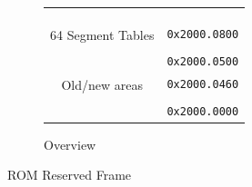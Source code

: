 \documentclass[12pt,a4paper,openright,twoside]{report}
\begin{document}
\begin{figure}[h]
\begin{subfigure}[b]{0.4\textwidth}
\begin{tabular}{cl}
			\multicolumn{1}{|c|}{\multirow{4}{*}{\cellcolor{gray}}}               &                                       \\ [3ex]
			\multicolumn{1}{|c|}{\cellcolor{gray}}                                &                                       \\
			\multicolumn{1}{|c|}{\cellcolor{gray}}                                &                                       \\
			\multicolumn{1}{|c|}{\cellcolor{gray}}                                & \multirow{2}{*}{\texttt{0x2000.0800}} \\ \cline{1-1}
			\multicolumn{1}{|c|}{\multirow{4}{*}{64 Segment Tables}}              &                                       \\ [-1ex]
			\multicolumn{1}{|c|}{}                                                & \multirow{2}{*}{}                     \\
			\multicolumn{1}{|c|}{}                                                &                                       \\
			\multicolumn{1}{|c|}{}                                                & \multirow{2}{*}{\texttt{0x2000.0500}} \\ \cline{1-1}
			\multicolumn{1}{|c|}{\multirow{2}{*}{\cellcolor{gray}}}               &                                       \\ [-2ex]
			\multicolumn{1}{|c|}{\cellcolor{gray}}                                & \multirow{2}{*}{\texttt{0x2000.0460}} \\ \cline{1-1}
			\multicolumn{1}{|c|}{\multirow{4}{*}{Old/new areas}}                  &                                       \\
			\multicolumn{1}{|c|}{}                                                & \multirow{2}{*}{}                     \\
			\multicolumn{1}{|c|}{}                                                &                                       \\
			\multicolumn{1}{|c|}{}                                                & \multirow{2}{*}{\texttt{0x2000.0000}} \\ \cline{1-1}
			                                                                      &
		\end{tabular}
		\caption{Overview}
		\label{fig:rom_reserved_frame_overview}
	\end{subfigure}
	\caption{ROM Reserved Frame}
	\label{fig:rom_reserved_frame}
\end{figure}
\end{document}
